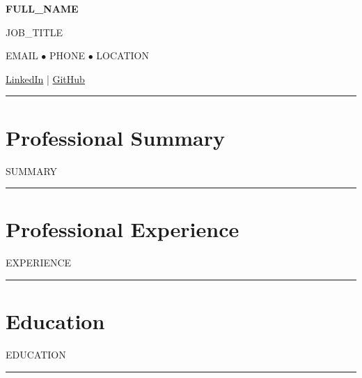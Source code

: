 \documentclass[11pt,a4paper]{article}
\newcommand{\divider}{
\vspace{2mm}
{\color{Border}\rule{\linewidth}{0.5pt}}
\vspace{3mm}
}
\begin{document}

\begin{center}

{\fontsize{26}{30}\selectfont\bfseries FULL_NAME}

\vspace{2mm}

{\Large\color{SecondaryBlue}JOB_TITLE}

\vspace{4mm}

EMAIL
\quad $\bullet$ \quad
PHONE
\quad $\bullet$ \quad
LOCATION

\vspace{2mm}

\href{LINKEDIN}{LinkedIn}
\quad | \quad
\href{GITHUB}{GitHub}

\end{center}

\divider


\section*{Professional Summary}

SUMMARY

\divider


\section*{Professional Experience}

EXPERIENCE

\divider


\section*{Education}

EDUCATION

\divider

\end{document}
